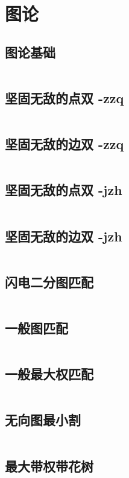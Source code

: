 \chapter{图论}
\section{图论基础}
\inputminted{cpp}{\source/graph-theory/basic.cpp}
\section{坚固无敌的点双 -zzq}
\inputminted{cpp}{\source/graph-theory/Biconnected-Point-Component -zzq.cpp}
\section{坚固无敌的边双 -zzq}
\inputminted{cpp}{\source/graph-theory/Biconnected-Edge-Component -zzq.cpp}

\section{坚固无敌的点双 -jzh}
\inputminted{cpp}{\source/graph-theory/biconnected-graph-vertex -jzh.cpp}
\section{坚固无敌的边双 -jzh}
\inputminted{cpp}{\source/graph-theory/biconnected-graph-edge -jzh.cpp}

\section{闪电二分图匹配}
\inputminted{cpp}{\source/graph-theory/Hopcroft-Karp.cpp}
\section{一般图匹配}
\inputminted{cpp}{\source/graph-theory/general-matching.cpp}
\section{一般最大权匹配}
\inputminted{cpp}{\source/graph-theory/weighted_blossom.cpp}
\section{无向图最小割}
\inputminted{cpp}{\source/graph-theory/StoerWagner_O(V^3).cpp}
\section{最大带权带花树}
\inputminted{cpp}{\source/graph-theory/weighted_blossom.cpp}
